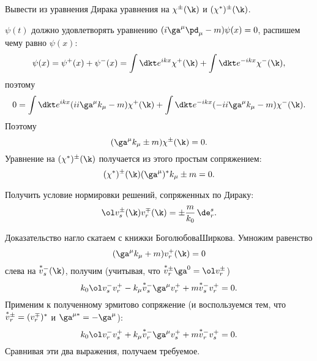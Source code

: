 \begin{problem}[Задача 43]
Вывести из уравнения Дирака уравнения на $\chi^{\pm}(\k)$ и $(\chi^*)^{\pm}(\k)$.
\end{problem}
\begin{solution}
$\psi(t)$ должно удовлетворять уравнению $(i\ga^{\mu}\pd_\mu -m)\psi(x)=0$, распишем чему равно
$\psi(x)$:
$$
\psi(x)=\psp (x)+\psi^-(x)=\int \dkt  e^{ikx}\chi^+(\k)+\int
\dkt  e^{-ikx}\chi^-(\k),
$$
поэтому
$$
0=\int \dkt  e^{ikx}(ii\ga^{\mu}k_\mu-m)\chi^+(\k)+\int \dkt e^{-ikx}(-ii\ga^{\mu}k_\mu-m)\chi^-(\k).
$$
Поэтому
$$
(\ga^{\mu}k_\mu\pm m)\chi^{\pm}(\k)=0.
$$
Уравнение на $(\chi^*)^{\pm}(\k)$ получается из этого простым сопряжением:
$$
(\chi^*)^{\pm}(\k)(\ga^{\mu})^* k_\mu\pm m=0.
$$
\end{solution}

\begin{problem}[Задача 45]
Получить условие нормировки решений, сопряженных по Дираку:
$$
\ol v^{\pm}_s(\k)v^{\mp}_r(\k)=\pm\frac{m}{k_0}\,\de^s_r.
$$
\end{problem}
\begin{solution}
Доказательство нагло скатаем с книжки Боголюбова\ч Ширкова. Умножим равенство
$$
(\ga^{\mu}k_\mu+m)v^+_r(\k)=0
$$
слева на $\avm_s(\k)$, получим (учитывая, что $\avpm_r\ga^0=\ol v^{\pm}_r$)
$$
k_0\ol v^-_sv^+_r-k_\mu \avm_s\ga^{\mu}v^+_r+m \avm_s v^+_r=0.
$$
Применим к полученному эрмитово сопряжение (и воспользуемся тем, что $\overset{*}{v}{}^\pm_r=(v^{\mp}_r)^*$ и
$\ga^{\mu *}=-\ga^{\mu}$):
$$
k_0\ol v^-_rv^+_s+k_\mu \avm_r\ga^{\mu}v^+_s+m\avm_rv_s^+=0.
$$
Сравнивая эти два выражения, получаем требуемое.
\end{solution}
